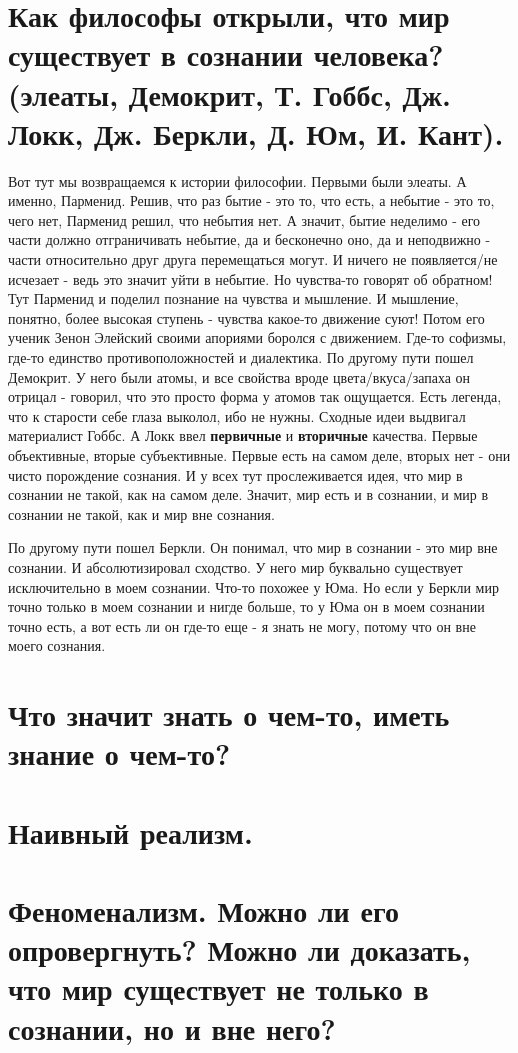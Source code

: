 \section{ Как философы открыли, что мир существует в сознании человека? (элеаты, Демокрит, Т. Гоббс, Дж. Локк, Дж. Беркли, Д. Юм, И. Кант).}
Вот тут мы возвращаемся к истории философии. Первыми были элеаты. А именно, Парменид. Решив, что раз бытие - это то, что есть, а небытие - это то, чего нет, Парменид решил, что небытия нет. А значит, бытие неделимо - его части должно отграничивать небытие, да и бесконечно оно, да и неподвижно - части относительно друг друга перемещаться могут. И ничего не появляется/не исчезает - ведь это значит уйти в небытие. Но чувства-то говорят об обратном! Тут Парменид и поделил познание на чувства и мышление. И мышление, понятно, более высокая ступень - чувства какое-то движение суют! Потом его ученик Зенон Элейский своими апориями боролся с движением. Где-то софизмы, где-то единство противоположностей и диалектика. По другому пути пошел Демокрит. У него были атомы, и все свойства вроде цвета/вкуса/запаха он отрицал - говорил, что это просто форма у атомов так ощущается. Есть легенда, что к старости себе глаза выколол, ибо не нужны. Сходные идеи выдвигал материалист Гоббс. А Локк ввел \textbf{первичные} и \textbf{вторичные} качества. Первые объективные, вторые субъективные. Первые есть на самом деле, вторых нет - они чисто порождение сознания. И у всех тут прослеживается идея, что мир в сознании не такой, как на самом деле. Значит, мир есть и в сознании, и мир в сознании не такой, как и мир вне сознания. 

По другому пути пошел Беркли. Он понимал, что мир в сознании - это мир вне сознании. И абсолютизировал сходство. У него мир буквально существует исключительно в моем сознании. Что-то похожее у Юма. Но если у Беркли мир точно только в моем сознании и нигде больше, то у Юма он в моем сознании точно есть, а вот есть ли он где-то еще - я знать не могу, потому что он вне моего сознания.

\section{ Что значит знать о чем-то, иметь знание о чем-то?}
\section{ Наивный реализм.}
\section{ Феноменализм. Можно ли его опровергнуть? Можно ли доказать, что мир существует не только в сознании, но и вне него?}
